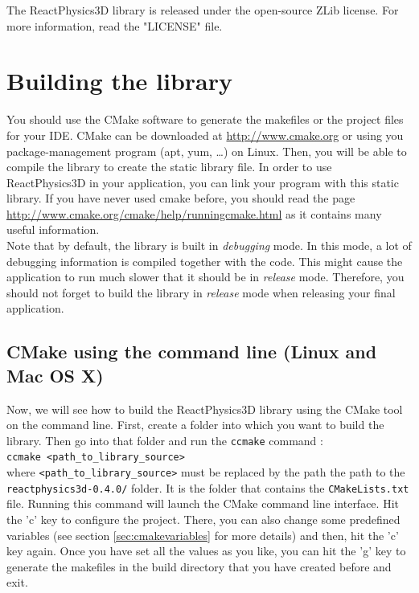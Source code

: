 \documentclass[a4paper,12pt]{article}
\begin{document}
    The ReactPhysics3D library is released under the open-source ZLib license. For more information, read the "LICENSE" file.

    \section{Building the library}
    \label{sec:building}

    You should use the CMake software to generate the makefiles or the 
    project files for your IDE. CMake can be downloaded at
    \url{http://www.cmake.org} or using you package-management program
    (apt, yum, \dots) on Linux. Then, you will be able to compile the library to create the static library
    file. In order to use ReactPhysics3D in your application, you can link your program with this static library.
    If you have never used cmake before, you should read the page \url{http://www.cmake.org/cmake/help/runningcmake.html} as
    it contains many useful information. \\

    Note that by default, the library is built in \emph{debugging} mode. In this mode, a lot of debugging information is compiled together with the code. This might cause the application to
    run much slower that it should be in \emph{release} mode. Therefore, you should not forget to build the library in \emph{release} mode when releasing your final
    application.

    \subsection{CMake using the command line (Linux and Mac OS X)}  

    Now, we will see how to build the ReactPhysics3D library using the CMake tool on the command line.
    First, create a folder into which you want to build the library. Then go into that folder and run
    the \texttt{ccmake} command : \\

    \texttt{ccmake \textless path\_to\_library\_source\textgreater} \\

    where \texttt{\textless path\_to\_library\_source\textgreater} must be replaced
    by the path the path to the \texttt{reactphysics3d-0.4.0/} folder. It is the folder that
    contains the \texttt{CMakeLists.txt} file. Running this command will launch the CMake command line interface.
    Hit the 'c' key to configure the project. There, you can also change some predefined variables (see section \ref{sec:cmakevariables} for more details)
    and then, hit the 'c' key again. Once you have set all the values as you like, you can hit the 'g' key to generate the makefiles in the build directory
    that you have created before and exit. \\
\end{document}
